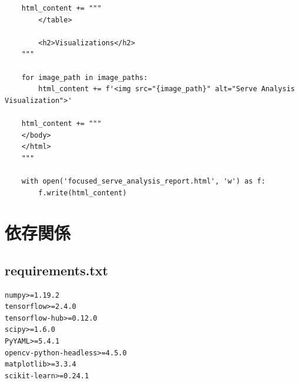 \documentclass[oneside]{suribt}[11pt]
\begin{document}
\begin{lstlisting}
    html_content += """
        </table>

        <h2>Visualizations</h2>
    """
    
    for image_path in image_paths:
        html_content += f'<img src="{image_path}" alt="Serve Analysis Visualization">'
    
    html_content += """
    </body>
    </html>
    """
    
    with open('focused_serve_analysis_report.html', 'w') as f:
        f.write(html_content)
\end{lstlisting}

\section{依存関係}

\subsection{requirements.txt}
\begin{lstlisting}
numpy>=1.19.2
tensorflow>=2.4.0
tensorflow-hub>=0.12.0
scipy>=1.6.0
PyYAML>=5.4.1
opencv-python-headless>=4.5.0
matplotlib>=3.3.4
scikit-learn>=0.24.1
\end{lstlisting}
\end{document}
